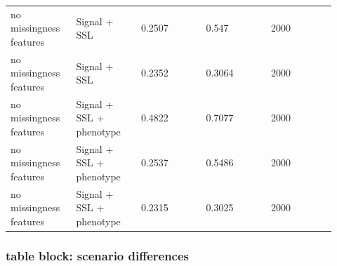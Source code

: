 \documentclass[utf8]{frontiers_suppmat}
\begin{document}
\begin{landscape}
\begin{longtable}{L{0.184\linewidth} L{0.184\linewidth} L{0.184\linewidth} L{0.184\linewidth} L{0.184\linewidth}}
no missingness features & Signal + SSL & 0.\allowbreak{}2507 & 0.\allowbreak{}547 & 2000 \\
no missingness features & Signal + SSL & 0.\allowbreak{}2352 & 0.\allowbreak{}3064 & 2000 \\
no missingness features & Signal + SSL + phenotype & 0.\allowbreak{}4822 & 0.\allowbreak{}7077 & 2000 \\
no missingness features & Signal + SSL + phenotype & 0.\allowbreak{}2537 & 0.\allowbreak{}5486 & 2000 \\
no missingness features & Signal + SSL + phenotype & 0.\allowbreak{}2315 & 0.\allowbreak{}3025 & 2000 \\
\end{longtable}
\normalsize
\end{landscape}


\subsubsection*{table block: scenario differences}
\end{document}

